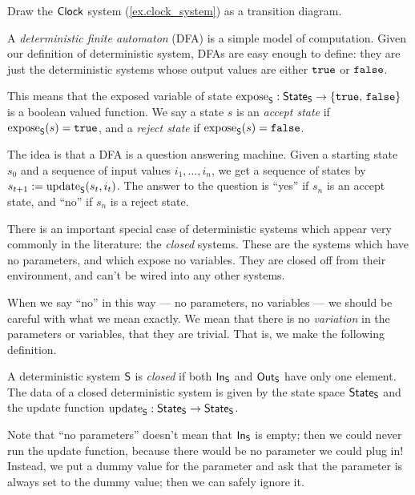 \documentclass[DynamicalBook]{subfiles}
\begin{document}
\begin{exercise}
  Draw the $\mathsf{Clock}$ system (\cref{ex.clock_system}) as a transition diagram.
\end{exercise}

\begin{example}
  A \emph{deterministic finite automaton} (DFA) is a simple model of computation.
  Given our definition of deterministic system, DFAs are easy enough to define:
  they are just the deterministic systems whose output values are either
  $\mathtt{true}$ or $\mathtt{false}$. 

  This means that the exposed variable of state $\mathrm{expose}_{\mathsf{S}} : \mathsf{State}_{\mathsf{S}} \to
  \{\mathtt{true},\, \mathtt{false}\}$ is a boolean valued function. We say a
  state $s$ is an \emph{accept state} if $\mathrm{expose}_{\mathsf{S}}(s) = \mathtt{true}$, and a
  \emph{reject state} if $\mathrm{expose}_{\mathsf{S}}(s) = \mathtt{false}$.

  The idea is that a DFA is a question answering machine. Given a starting state
  $s_0$ and a sequence of input values $i_1, \ldots, i_n$, we get a sequence of
  states by $s_{t+1}:= \mathrm{update}_{\mathsf{S}}(s_t, i_t)$. The answer to the question is
  ``yes'' if $s_n$ is an accept state, and ``no'' if $s_n$ is a reject state.

\end{example}

There is an important special case of deterministic systems which appear very
commonly in the literature: the \emph{closed} systems. These are the systems
which have no parameters, and which expose no variables. They are closed off
from their environment, and can't be wired into any other systems.

When we say ``no'' in this way --- no parameters, no variables --- we should be
careful with what we mean exactly. We mean that there is no \emph{variation} in
the parameters or variables, that they are trivial. That is, we make the
following definition.
\begin{definition}
  A deterministic system $\mathsf{S}$ is \emph{closed} if both $\mathsf{In}_{\mathsf{S}}$ and
  $\mathsf{Out}_{\mathsf{S}}$ have only one element. The data of a closed deterministic system is
  given by the state space $\mathsf{State}_{\mathsf{S}}$ and the update function $\mathrm{update}_{\mathsf{S}} :
  \mathsf{State}_{\mathsf{S}} \to \mathsf{State}_{\mathsf{S}}$.
\end{definition}
Note that ``no parameters'' doesn't mean that $\mathsf{In}_{\mathsf{S}}$ is empty; then we could
never run the update function, because there would be no parameter we could plug
in! Instead, we put a dummy value for the parameter and ask that the parameter
is always set to the dummy value; then we can safely ignore it.
\end{document}
